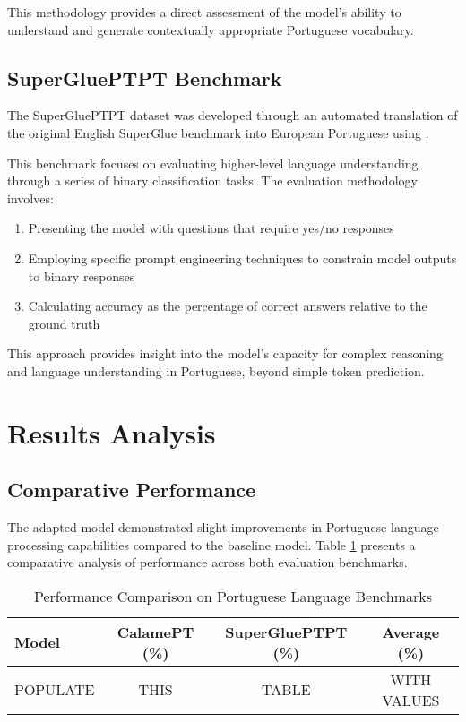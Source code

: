 This methodology provides a direct assessment of the model's ability to understand and generate contextually appropriate Portuguese vocabulary.

\subsection{SuperGluePTPT Benchmark}
The SuperGluePTPT dataset was developed through an automated translation of the original English SuperGlue benchmark \cite{https://proceedings.neurips.cc/paper/2019/hash/4496bf24afe7fab6f046bf4923da8de6-Abstract.html} into European Portuguese using \cite{DeepL}.

This benchmark focuses on evaluating higher-level language understanding through a series of binary classification tasks. The evaluation methodology involves:

\begin{enumerate}
    \item Presenting the model with questions that require yes/no responses
    \item Employing specific prompt engineering techniques to constrain model outputs to binary responses
    \item Calculating accuracy as the percentage of correct answers relative to the ground truth
\end{enumerate}

This approach provides insight into the model's capacity for complex reasoning and language understanding in Portuguese, beyond simple token prediction.

\section{Results Analysis}
\subsection{Comparative Performance}
The adapted model demonstrated slight improvements in Portuguese language processing capabilities compared to the baseline model. Table \ref{tab:benchmark_results} presents a comparative analysis of performance across both evaluation benchmarks.

\begin{table}[h]
\centering
\caption{Performance Comparison on Portuguese Language Benchmarks}
\label{tab:benchmark_results}
\begin{tabular}{lccc}
\hline
\textbf{Model} & \textbf{CalamePT (\%)} & \textbf{SuperGluePTPT (\%)} & \textbf{Average (\%)} \\
\hline
POPULATE & THIS & TABLE & WITH VALUES \\
\hline
\end{tabular}
\end{table}

